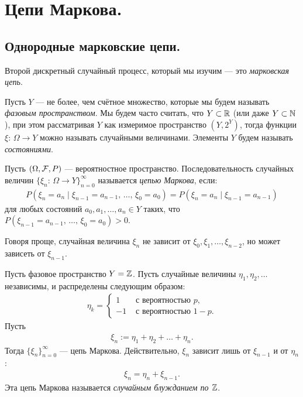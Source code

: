 \documentclass[../main.tex]{subfiles}
\begin{document}
\newpage
\section{Цепи Маркова.}

\subsection{Однородные марковские цепи.}

Второй дискретный случайный процесс, который мы изучим --- это \textit{марковская цепь}.

\begin{df}
 Пусть $ Y $ --- не более, чем счётное множество, которые мы будем называть \textit{фазовым пространством}. Мы будем часто считать, что $ Y \subset \mathbb{R} $ (или даже $ Y \subset \mathbb{N} $), при этом рассматривая $ Y $ как измеримое пространство $ (Y,2^{Y}) $, тогда функции $ \xi\colon\,\Omega\to Y $ можно называть случайными величинами. Элементы $ Y $ будем называть \textit{состояниями}.

 Пусть $ (\Omega,\mathcal F,P) $ --- вероятностное пространство. Последовательность случайных величин $ \{\xi_n \colon\,\Omega\to Y\}_{n = 0}^{\infty} $ называется \textit{цепью Маркова}, если:
 \begin{align*}
  P(\xi_n = a_n \mid \xi_{n-1} = a_{n-1},\, \ldots,\, \xi_0 = a_0) = P(\xi_n = a_n \mid \xi_{n-1} = a_{n-1})
 \end{align*} для любых состояний $ a_0, a_1, \ldots, a_n \in Y $ таких, что $ P(\xi_{n-1} = a_{n-1},\, \ldots,\, \xi_0 = a_0) > 0 $.

 Говоря проще, случайная величина $ \xi_n $ не зависит от $\xi_0, \xi_1, \ldots, \xi_{n-2} $, но может зависеть от $ \xi_{n-1} $.
\end{df}

\begin{exmpl}
 \label{exmpl:random_walk_z}
 Пусть фазовое пространство $ Y = \mathbb{Z} $. Пусть случайные величины $ \eta_1, \eta_2, \ldots $ независимы, и распределены следующим образом:
 \begin{align*}
  \eta_k = \begin{cases}
   1 &\text{ с вероятностью } p, \\
   -1 &\text{ с вероятностью } 1-p.
  \end{cases} 
 \end{align*} Пусть
 \begin{align*}
  \xi_n := \eta_1 + \eta_2 + \ldots + \eta_n.
 \end{align*} Тогда $\{\xi_{n}\}_{n=0}^{\infty} $ --- цепь Маркова. Действительно, $ \xi_n $ зависит лишь от $ \xi_{n-1} $ и от $ \eta_n $:
 \begin{align*}
  \xi_n = \eta_n + \xi_{n-1}.
 \end{align*} Эта цепь Маркова называется \textit{случайным блужданием по $ \mathbb{Z} $}.
\end{exmpl}
\end{document}
